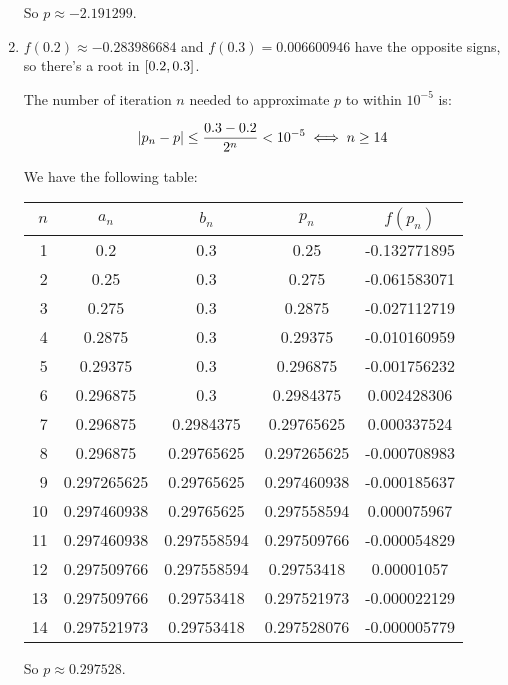 \documentclass[../../Assignments.tex]{subfiles}
\begin{document}
\begin{solution}
\begin{enumerate}[label=(\alph*)]
            So \(p \approx \num{-2.191299}\).

        \item \(f(\num{0.2}) \approx \num{-0.283986684}\) and \(f(\num{0.3}) =
            \num{0.006600946}\) have the opposite signs, so there's a root in
            \(\interval{\num{0.2}}{\num{0.3}}\).

            The number of iteration \(n\) needed to approximate \(p\) to
            within \(10^{-5}\) is:

            \[\abs{p_n - p} \leq \frac{\num{0.3} - \num{0.2}}{2^n} < 10^{-5} \iff n \geq 14\]

            We have the following table:

            \begin{longtable}{r S[table-format=1.9] S[table-format=1.9] S[table-format=1.9] S[table-format=-1.9]}
                \toprule
                \(n\)  &   {\(a_n\)}   &   {\(b_n\)}   &   {\(p_n\)}   &  {\(f(p_n)\)}  \\
                  &  0.2          &  0.3          &  0.25         &  -0.132771895  \\
                    2  &  0.25         &  0.3          &  0.275        &  -0.061583071  \\
                    3  &  0.275        &  0.3          &  0.2875       &  -0.027112719  \\
                    4  &  0.2875       &  0.3          &  0.29375      &  -0.010160959  \\
                    5  &  0.29375      &  0.3          &  0.296875     &  -0.001756232  \\
                    6  &  0.296875     &  0.3          &  0.2984375    &   0.002428306  \\
                    7  &  0.296875     &  0.2984375    &  0.29765625   &   0.000337524  \\
                    8  &  0.296875     &  0.29765625   &  0.297265625  &  -0.000708983  \\
                    9  &  0.297265625  &  0.29765625   &  0.297460938  &  -0.000185637  \\
                   10  &  0.297460938  &  0.29765625   &  0.297558594  &   0.000075967  \\
                   11  &  0.297460938  &  0.297558594  &  0.297509766  &  -0.000054829  \\
                   12  &  0.297509766  &  0.297558594  &  0.29753418   &   0.00001057   \\
                   13  &  0.297509766  &  0.29753418   &  0.297521973  &  -0.000022129  \\
                   14  &  0.297521973  &  0.29753418   &  0.297528076  &  -0.000005779  \\
               \bottomrule
            \end{longtable}

            So \(p \approx \num{0.297528}\).
    \end{enumerate}
\end{solution}
\end{document}
